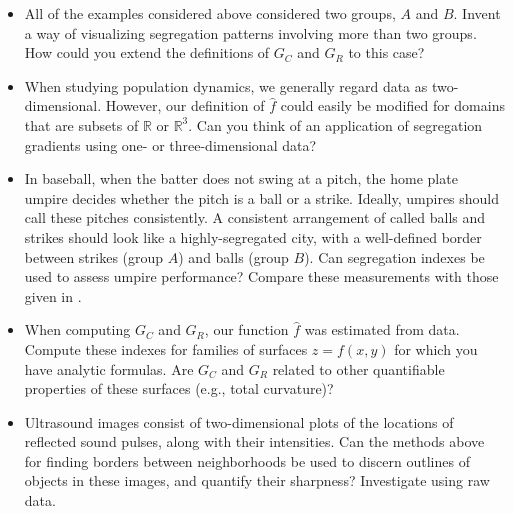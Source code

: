\documentclass{article}
\theoremstyle{theorem}
\theoremstyle{definition}
\begin{document}
\begin{itemize}
  \item All of the examples considered above considered two groups, $A$ and $B$. Invent a way of visualizing segregation patterns involving more than two groups. How could you extend the definitions of $G_C$ and $G_R$ to this case?
  \item When studying population dynamics, we generally regard data as two-dimensional. However, our definition of $\hat{f}$ could easily be modified for domains that are subsets of $\mathbb{R}$ or $\mathbb{R}^3$.  Can you think of an application of segregation gradients using one- or three-dimensional data?
  \item In baseball, when the batter does not swing at a pitch, the home plate umpire decides whether the pitch is a ball or a strike. Ideally, umpires should call these pitches consistently. A consistent arrangement of called balls and strikes should look like a highly-segregated city, with a well-defined border between strikes (group $A$) and balls (group $B$). Can segregation indexes be used to assess umpire performance? Compare these measurements with those given in \cite{hunter18}.
  \item When computing $G_C$ and $G_R$, our function $\hat{f}$ was estimated from data. Compute these indexes for families of surfaces $z = f(x,y)$ for which you have analytic formulas. Are $G_C$ and $G_R$ related to other quantifiable properties of these surfaces (e.g., total curvature)?
  \item Ultrasound images consist of two-dimensional plots of the locations of reflected sound pulses, along with their intensities. Can the methods above for finding borders between neighborhoods be used to discern outlines of objects in these images, and quantify their sharpness? Investigate using raw data.
\end{itemize}
\end{document}
